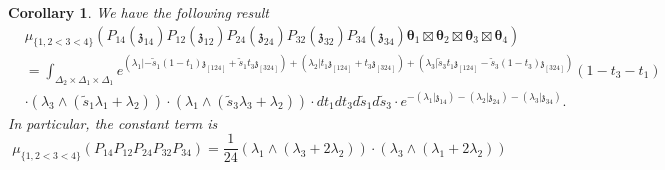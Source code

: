 \documentclass[11pt]{amsart}
\newcommand{\agraphW}{
  \mathbf{W}_{\tikz[baseline=-0.5ex]{
      \coordinate (A) at (0,0);
      \coordinate (B) at (4mm,0);
      \coordinate (C) at (2mm,2mm);
      \coordinate (D) at (2mm,-2mm);

      \fill (A) circle (0.5mm);
      \fill (B) circle (0.5mm);
      \fill (C) circle (0.5mm);
      \fill (D) circle (0.5mm);

      \draw (A) -- (C);
      \draw (A) -- (D);
      \draw (C) -- (D);
      \draw (B) -- (C);
      \draw (B) -- (D);
  }}
}
\newtheorem{cor}[thm]{Corollary}
\theoremstyle{definition}
\theoremstyle{remark}
\numberwithin{equation}{section}
\begin{document}
\iffalse
\begin{proof}


\begin{tabular}{|c|c|c|}
\hline
  & $\displaystyle \lambda _{1}$ & $\displaystyle \lambda _{2}$ \\
\hline
 $\displaystyle \mathfrak{z}_{1o}$ & $\displaystyle \boxed{r_1-1=l_{1o} -1}$ & $ $$\displaystyle -t_{1} =\boxed{-l_{12} +l_{1o} +1=-l_{2o}}$ \\
\hline
 $\displaystyle \mathfrak{z}_{2o}$ & $\displaystyle \boxed{-l_{1o}}$ & $\displaystyle -1+t_{1} =\boxed{-l_{2o} -1}$ \\
\hline
 $\displaystyle \mathfrak{z}_{12}$ & $\displaystyle \boxed{-l_{1o}}$ & $\displaystyle t_{1} =\boxed{-l_{21} -l_{1o} +1=l_{o2}}$ \\
 \hline
\end{tabular}

$$
\agraphW
$$
  \begin{align*}
     & F_{o,2o}\wedge F_{o,21} \\
     & =l_{1o}\cdot \lambda_1\wedge\lambda_2.
  \end{align*}
  $$
   \mathbf{L}_{\Gamma,\mathbf{H}(o,e)}=\frac{l_{1o}-1}{(l_{2o}-l_{21})(l_{2o}-l_{21}+1)}=\frac{1}{l_{1o}}.
  $$
\end{proof}
\fi
\begin{cor}
    We have the following result
    \begin{align*}
&\mu_{\{1,2<3<4\}}\left(P_{14}(\mathfrak{z}_{14})P_{12}(\mathfrak{z}_{12})P_{24}(\mathfrak{z}_{24})P_{32}(\mathfrak{z}_{32})P_{34}(\mathfrak{z}_{34})\boldsymbol{\theta}_1\boxtimes \boldsymbol{\theta}_2\boxtimes\boldsymbol{\theta}_3\boxtimes \boldsymbol{\theta}_4\right)\\
&=\int_{\Delta_2\times\Delta_1\times\Delta_1}e^{   (\lambda_1|-\tilde{s}_1(1-t_1)\mathfrak{z}_{[124]}+\tilde{s}_1t_3\mathfrak{z}_{[324]})+ (\lambda_2|t_1\mathfrak{z}_{[124]}+t_3 \mathfrak{z}_{[324]})+      (\lambda_3|\tilde{s}_3t_1\mathfrak{z}_{[124]}-\tilde{s}_3(1-t_3)\mathfrak{z}_{[324]})}(1-t_3-t_1)\\
   &\cdot(\lambda_3\wedge(\tilde{s}_1\lambda_1+\lambda_2))\cdot (\lambda_1\wedge(\tilde{s}_3\lambda_3+\lambda_2)) \cdot dt_1dt_3d\tilde{s}_1d\tilde{s}_3\cdot e^{-(\lambda_1|\mathfrak{z}_{14})-(\lambda_2|\mathfrak{z}_{24})-(\lambda_3|\mathfrak{z}_{34})}.
      \end{align*}
    In particular, the constant term is
    $$
    \mu_{\{1,2<3<4\}}\left(P_{14}P_{12}P_{24}P_{32}P_{34}\right)=\frac{1}{24}(\lambda_1\wedge(\lambda_3+2\lambda_2))\cdot (\lambda_3\wedge(\lambda_1+2\lambda_2))
    $$
\end{cor}
\end{document}
